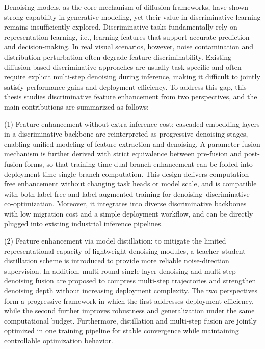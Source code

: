 \setlength{\baselineskip}{20pt}
\begin{englishabstract}
Denoising models, as the core mechanism of diffusion frameworks, have shown strong capability in generative modeling, yet their value in discriminative learning remains insufficiently explored. Discriminative tasks fundamentally rely on representation learning, i.e., learning features that support accurate prediction and decision-making. In real visual scenarios, however, noise contamination and distribution perturbation often degrade feature discriminability. Existing diffusion-based discriminative approaches are usually task-specific and often require explicit multi-step denoising during inference, making it difficult to jointly satisfy performance gains and deployment efficiency. To address this gap, this thesis studies discriminative feature enhancement from two perspectives, and the main contributions are summarized as follows:
\par
(1) Feature enhancement without extra inference cost: cascaded embedding layers in a discriminative backbone are reinterpreted as progressive denoising stages, enabling unified modeling of feature extraction and denoising. A parameter fusion mechanism is further derived with strict equivalence between pre-fusion and post-fusion forms, so that training-time dual-branch enhancement can be folded into deployment-time single-branch computation. This design delivers computation-free enhancement without changing task heads or model scale, and is compatible with both label-free and label-augmented training for denoising--discriminative co-optimization. Moreover, it integrates into diverse discriminative backbones with low migration cost and a simple deployment workflow, and can be directly plugged into existing industrial inference pipelines.
\par
(2) Feature enhancement via model distillation: to mitigate the limited representational capacity of lightweight denoising modules, a teacher--student distillation scheme is introduced to provide more reliable noise-direction supervision. In addition, multi-round single-layer denoising and multi-step denoising fusion are proposed to compress multi-step trajectories and strengthen denoising depth without increasing deployment complexity. The two perspectives form a progressive framework in which the first addresses deployment efficiency, while the second further improves robustness and generalization under the same computational budget. Furthermore, distillation and multi-step fusion are jointly optimized in one training pipeline for stable convergence while maintaining controllable optimization behavior.

\end{englishabstract}
